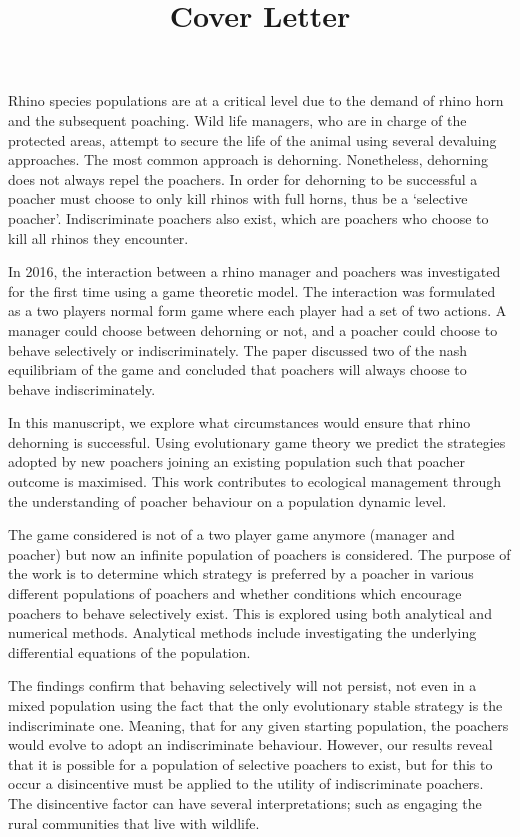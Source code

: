 \documentclass[10pt]{article}
\title{Cover Letter}
\date{}
\begin{document}
\maketitle

Rhino species populations are at a critical level due to the demand of rhino horn
and the subsequent poaching. Wild life managers, who are in charge of the protected
areas, attempt to secure the life of the animal using several devaluing approaches.
The most common approach is dehorning. Nonetheless, dehorning does not always repel
the poachers. In order for dehorning to be successful a poacher must choose to only
kill rhinos with full horns, thus be a ‘selective poacher'. Indiscriminate poachers
also exist, which are poachers who choose to kill all rhinos they encounter.

In 2016, the interaction between a rhino manager and poachers was investigated for
the first time using a game theoretic model. The interaction was formulated as a
two players normal form game where each player had a set of two actions. A manager
could choose between dehorning or not, and a poacher could choose to behave selectively
or indiscriminately. The paper discussed two of the nash equilibriam of the game
and concluded that poachers will always choose to behave indiscriminately.

In this manuscript, we explore what circumstances would ensure that rhino dehorning
is successful. Using evolutionary game theory we predict the strategies adopted
by new poachers joining an existing population such that poacher outcome is
maximised. This work contributes to ecological management through the understanding
of poacher behaviour on a population dynamic level.

The game considered is not of a two player game
anymore (manager and poacher) but now an infinite population of poachers is considered.
The purpose of the work is to determine which strategy is preferred by a poacher
in various different populations of poachers and whether conditions which encourage
poachers to behave selectively exist. This is explored using both analytical and
numerical methods. Analytical methods include investigating the underlying differential
equations of the population.

The findings confirm that behaving selectively will not persist, not even in a
mixed population using the fact that the only evolutionary stable strategy is the
indiscriminate one. Meaning, that for any given starting population, the poachers
would evolve to adopt an indiscriminate behaviour. However, our results reveal
that it is possible for a population of selective poachers to exist, but for this
to occur a disincentive must be applied to the utility of indiscriminate poachers.
The disincentive factor can have several interpretations; such as engaging the
rural communities that live with wildlife.
\end{document}
